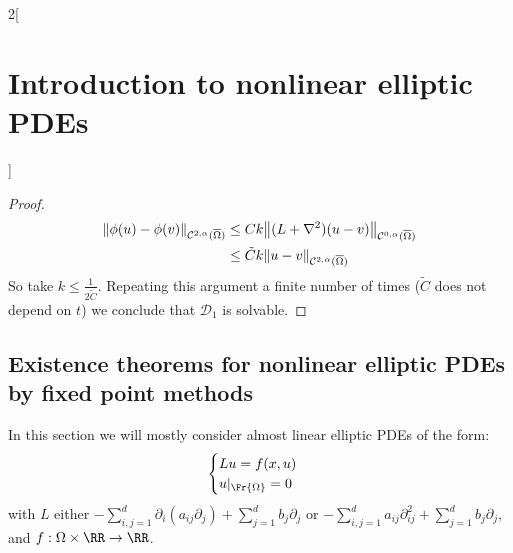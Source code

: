 \documentclass[../../../main_math.tex]{subfiles}
\begin{document}
\begin{multicols}{2}[\section{Introduction to nonlinear elliptic PDEs}]
\begin{proof}
    \begin{align*}
      \norm{\phi(u)-\phi(v)}_{\mathcal{C}^{2,\alpha}(\overline{\Omega})} & \leq Ck\norm{(L+\laplacian)(u-v)}_{\mathcal{C}^{0,\alpha}(\overline{\Omega})} \\
                                                                         & \leq \tilde{C}k\norm{u-v}_{\mathcal{C}^{2,\alpha}(\overline{\Omega})}
    \end{align*}
    So take $k\leq \frac{1}{2\tilde{C}}$. Repeating this argument a finite number of times ($\tilde{C}$ does not depend on $t$) we conclude that $\mathcal{D}_1$ is solvable.
  \end{proof}
  \subsection{Existence theorems for nonlinear elliptic PDEs by fixed point methods}
  In this section we will mostly consider almost linear elliptic PDEs of the form:
  \begin{equation}\label{INEPDE:AlmostLinear}
    \begin{cases}
      Lu=f(x,u) \\
      u|_{\Fr{\Omega}}=0
    \end{cases}
  \end{equation}
  with $L$ either $-\sum_{i,j=1}^d\partial_i(a_{ij}\partial_j)+\sum_{j=1}^db_j\partial_j$ or $-\sum_{i,j=1}^d a_{ij} \partial_{ij}^2+\sum_{j=1}^db_j\partial_j$, and $f:\Omega\times \RR\to \RR$.

\end{multicols}
\end{document}
